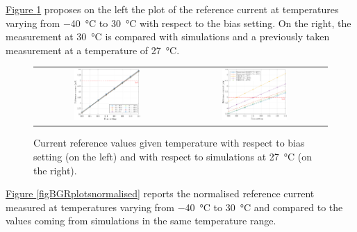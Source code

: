\par
\hyperref[figBGRplotXbias]{Figure \ref{figBGRplotXbias}} proposes on the left the plot of the reference current at temperatures varying from \SI{-40}{\celsius} to \SI{30}{\celsius} with respect to the bias setting. On the right, the measurement at \SI{30}{\celsius} is compared with simulations and a previously taken measurement at a temperature of \SI{27}{\celsius}.

\begin{figure}[h!]
    \centering
    \begin{tabular}{cc}
        \includegraphics[width=0.475\textwidth]{Images/chap1/results/BGR_current/BGR_current_XBBB.pdf} & \includegraphics[width=0.475\textwidth]{Images/chap1/results/BGR_current/BGR_current_XBBB_27C_sim.pdf}\\
    \end{tabular}
    \caption{Current reference values given temperature with respect to bias setting (on the left) and with respect to simulations at \SI{27}{\celsius} (on the right).}
    \label{figBGRplotXbias}
\end{figure}

\par
\hyperref[figBGRplotsnormalised]{Figure \ref{figBGRplotsnormalised}} reports the normalised reference current measured at temperatures varying from \SI{-40}{\celsius} to \SI{30}{\celsius} and compared to the values coming from simulations in the same temperature range.

